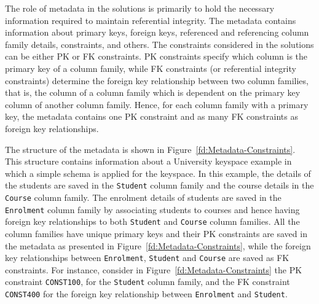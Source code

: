 The role of metadata in  the solutions is primarily to hold the necessary
 information required to maintain referential integrity. The metadata contains  
 information about primary keys,   foreign keys,  referenced and referencing
 column family details, constraints, and others.  The constraints considered in
 the solutions can be either \ac{PK} or \ac{FK} 
constraints. \ac{PK}
constraints specify which column is the primary key of a column family, while 
\ac{FK} constraints (or referential integrity constraints) determine the
foreign key relationship between two column families, that is, the
 column of a column family which  is dependent on the primary key  column of
 another column family.  Hence, for each column family with a primary key,  the
metadata  contains one \ac{PK} constraint  and  as
many \ac{FK} constraints as foreign key relationships. 

The structure of the metadata is shown in
Figure~\ref{fd:Metadata-Constraints}.  This structure contains information about a
University keyspace example in which  a simple schema is applied for the
keyspace. In this example,  the details of the students are saved in  the
\texttt{Student} column family and the course
 details in the \texttt{Course} column family.
 The enrolment details of students are saved in the 
\texttt{Enrolment} column family by associating students to courses and
hence having foreign key relationships to both \texttt{Student} and
\texttt{Course} column families.
All the column families have unique primary keys and their \ac{PK} constraints are saved in
the metadata as presented in Figure~\ref{fd:Metadata-Constraints}, while the
foreign key relationships between \texttt{Enrolment}, \texttt{Student} and
\texttt{Course} are saved as \ac{FK} constraints.  For instance, consider in
 Figure~\ref{fd:Metadata-Constraints} the \ac{PK} constraint \texttt{CONST100},
 for the \texttt{Student} column family, and the \ac{FK} constraint  
 \texttt{CONST400} for the foreign key relationship between
\texttt{Enrolment} and \texttt{Student}.

